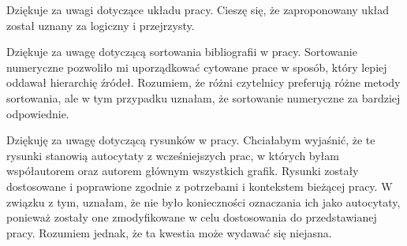 \begin{frame}[t]
    \begin{block}{\tb}
\end{block}

\begin{block}{\tb}
\end{block}

Dziękuje za uwagi dotyczące układu  pracy. Cieszę się, że zaproponowany  układ został uznany za logiczny i przejrzysty. 


\begin{block}{\tb}
\end{block}

Dziękuje za uwagę dotyczącą sortowania bibliografii w pracy. 
Sortowanie numeryczne pozwoliło mi uporządkować cytowane prace w sposób, który lepiej oddawał hierarchię źródeł. 
Rozumiem, że różni czytelnicy preferują różne metody sortowania, ale w tym przypadku uznałam, że sortowanie numeryczne za bardziej odpowiednie.

\end{frame}





\begin{frame}[t]
    \begin{block}{\tb}
    \end{block}



    \begin{block}{\tb}
    \end{block}


    Dziękuję za uwagę dotyczącą rysunków w pracy. 
    Chciałabym wyjaśnić, że te rysunki stanowią autocytaty z wcześniejszych prac, w których byłam współautorem oraz autorem głównym wszystkich grafik. Rysunki zostały dostosowane i poprawione zgodnie z potrzebami i kontekstem bieżącej pracy. W związku z tym, uznałam, że nie było konieczności oznaczania ich jako autocytaty, ponieważ zostały one zmodyfikowane w celu dostosowania do przedstawianej pracy. Rozumiem jednak, że ta kwestia może wydawać się niejasna.


\end{frame}

